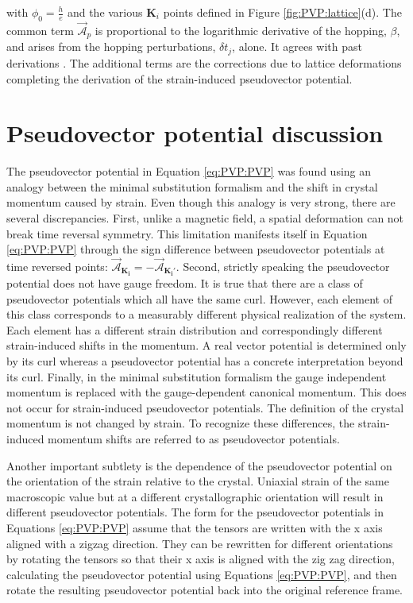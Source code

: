 with $\phi_0=\frac{h}{e}$ and the various $\bm{K}_i$ points defined in Figure \ref{fig:PVP:lattice}(d).
The common term $\vec{\mathcal{A}}_p$ is proportional to the logarithmic derivative of the hopping, $\beta$, and arises from the hopping perturbations, $\delta t_j$, alone.
It agrees with past derivations \cite{CastroNeto2009,Vozmediano2010}. 
The additional terms are the corrections due to lattice deformations completing the derivation of the strain-induced pseudovector potential.

\section{Pseudovector potential discussion}
The pseudovector potential in Equation \ref{eq:PVP:PVP} was found using an analogy between the minimal substitution formalism and the shift in crystal momentum caused by strain.
Even though this analogy is very strong, there are several discrepancies.
First, unlike a magnetic field, a spatial deformation can not break time reversal symmetry.
This limitation manifests itself in Equation \ref{eq:PVP:PVP} through the sign difference between pseudovector potentials at time reversed points: $\vec{\mathcal{A}}_{\bm{K_i}} = - \vec{\mathcal{A}}_{\bm{K_i'}}$.
Second, strictly speaking the pseudovector potential does not have gauge freedom.
It is true that there are a class of pseudovector potentials which all have the same curl.
However, each element of this class corresponds to a measurably different physical realization of the system.
Each element has a different strain distribution and correspondingly different strain-induced shifts in the momentum.
A real vector potential is determined only by its curl whereas a pseudovector potential has a concrete interpretation beyond its curl.
Finally, in the minimal substitution formalism the gauge independent momentum is replaced with the gauge-dependent canonical momentum. 
This does not occur for strain-induced pseudovector potentials.
The definition of the crystal momentum is not changed by strain.
To recognize these differences, the strain-induced momentum shifts are referred to as pseudovector potentials.

Another important subtlety is the dependence of the pseudovector potential on the orientation of the strain relative to the crystal.
Uniaxial strain of the same macroscopic value but at a different crystallographic orientation will result in different pseudovector potentials.
The form for the pseudovector potentials in Equations \ref{eq:PVP:PVP} assume that the tensors are written with the x axis aligned with a zigzag direction.
They can be rewritten for different orientations by rotating the tensors so that their x axis is aligned with the zig zag direction, calculating the pseudovector potential using Equations \ref{eq:PVP:PVP}, and then rotate the resulting pseudovector potential back into the original reference frame.

